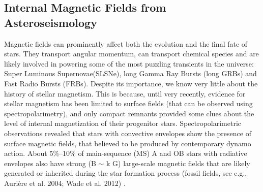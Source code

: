 {\color{red}\subsection{Internal Magnetic Fields from Asteroseismology}}
Magnetic fields can prominently affect both the evolution and the final fate of stars. They transport angular momentum, can transport chemical species
and are likely involved in powering some of the most puzzling transients in the universe: Super Luminous Supernovae(SLSNe), long Gamma Ray Bursts (long GRBs) and Fast Radio Bursts (FRBs). 
Despite its importance, we know very little about the history of stellar magnetism. This is  because, until very recently, 
evidence for stellar magnetism has been limited to surface fields (that can be observed using spectropolarimetry),
and only compact remnants provided some clues about the level of internal magnetization of their progenitor stars.
Spectropolarimetric observations revealed that stars with convective envelopes show the presence of
surface magnetic fields, that believed to be produced by contemporary dynamo action.
About 5\%–10\% of main-sequence (MS) A and OB stars with radiative envelopes also have strong (B $\sim$ k G)
large-scale magnetic fields that are likely generated or inherited during the star
formation process (fossil fields, see e.g., Aurière et al. 2004; Wade et al. 2012) . 